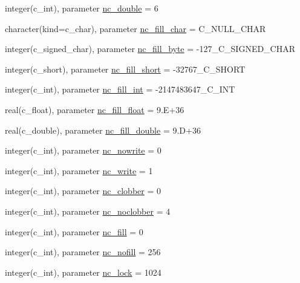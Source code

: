 \begin{DoxyCompactItemize}
\item 
integer(c\+\_\+int), parameter \hyperlink{namespacenetcdf__nc__data_ac0744e496a8eb335472d194685557cce}{nc\+\_\+double} = 6
\item 
character(kind=c\+\_\+char), parameter \hyperlink{namespacenetcdf__nc__data_a6515514ae08e26a43c055e0c08db36f7}{nc\+\_\+fill\+\_\+char} = C\+\_\+\+N\+U\+L\+L\+\_\+\+C\+H\+AR
\item 
integer(c\+\_\+signed\+\_\+char), parameter \hyperlink{namespacenetcdf__nc__data_a17bcf94931f569f0f454653d0971b1d4}{nc\+\_\+fill\+\_\+byte} = -\/127\+\_\+\+C\+\_\+\+S\+I\+G\+N\+E\+D\+\_\+\+C\+H\+AR
\item 
integer(c\+\_\+short), parameter \hyperlink{namespacenetcdf__nc__data_a302781a8122b18c35e60d06913c8727b}{nc\+\_\+fill\+\_\+short} = -\/32767\+\_\+\+C\+\_\+\+S\+H\+O\+RT
\item 
integer(c\+\_\+int), parameter \hyperlink{namespacenetcdf__nc__data_ac115ad613c2ed51ca507d2e54412409d}{nc\+\_\+fill\+\_\+int} = -\/2147483647\+\_\+\+C\+\_\+\+I\+NT
\item 
real(c\+\_\+float), parameter \hyperlink{namespacenetcdf__nc__data_a5c70156320c1a2a738e211e51addee1b}{nc\+\_\+fill\+\_\+float} = 9.\+E+36
\item 
real(c\+\_\+double), parameter \hyperlink{namespacenetcdf__nc__data_a60cf4a756a12609a3c7f3dcbf3caf7be}{nc\+\_\+fill\+\_\+double} = 9.\+D+36
\item 
integer(c\+\_\+int), parameter \hyperlink{namespacenetcdf__nc__data_a5364e0c29c2d0746fd8188821cf38549}{nc\+\_\+nowrite} = 0
\item 
integer(c\+\_\+int), parameter \hyperlink{namespacenetcdf__nc__data_a72f6e9d6581d369c69a281e9480455dd}{nc\+\_\+write} = 1
\item 
integer(c\+\_\+int), parameter \hyperlink{namespacenetcdf__nc__data_a025f363aa29ed983ae25be4a9c9fcc28}{nc\+\_\+clobber} = 0
\item 
integer(c\+\_\+int), parameter \hyperlink{namespacenetcdf__nc__data_aaf7a0a7e557b1b321d19d30e1211f14d}{nc\+\_\+noclobber} = 4
\item 
integer(c\+\_\+int), parameter \hyperlink{namespacenetcdf__nc__data_a9474c1e8363819852aef3786fcbdb3b3}{nc\+\_\+fill} = 0
\item 
integer(c\+\_\+int), parameter \hyperlink{namespacenetcdf__nc__data_a91a7bc224294e11fb792e4c54ea2f491}{nc\+\_\+nofill} = 256
\item 
integer(c\+\_\+int), parameter \hyperlink{namespacenetcdf__nc__data_ae12d4f97414d40d37a87d41a522912f1}{nc\+\_\+lock} = 1024

\end{DoxyCompactItemize}

